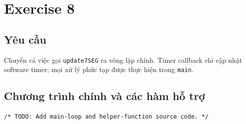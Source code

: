 \section{Exercise 8}

\subsection{Yêu cầu}
Chuyển cả việc gọi \texttt{update7SEG} ra vòng lặp chính. Timer callback chỉ cập
nhật software timer; mọi xử lý phức tạp được thực hiện trong \texttt{main}.

\subsection{Chương trình chính và các hàm hỗ trợ}
\begin{lstlisting}[caption={Main processing -- Exercise 8}]
/* TODO: Add main-loop and helper-function source code. */
\end{lstlisting}
